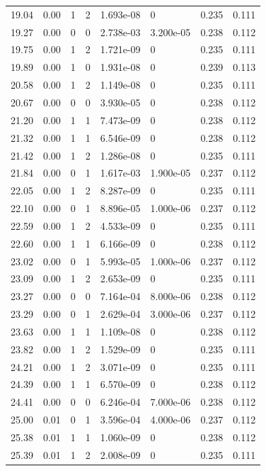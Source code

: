 \documentclass[preview]{standalone}
\begin{document}
{{{\begin{tabular}{L{1.2cm}C{1.2cm} C{0.3cm}C{0.5cm} C{1.4cm}C{1.4cm} C{1.4cm}C{1.4cm}}
  19.04  &  0.00  & 1     &  2 &  1.693e-08  & 0  & 0.235 &  0.111   \\ 
  19.27  &  0.00  & 0     &  0 &  2.738e-03  & 3.200e-05  & 0.238 &  0.112   \\ 
  19.75  &  0.00  & 1     &  2 &  1.721e-09  & 0  & 0.235 &  0.111   \\ 
  19.89  &  0.00  & 1     &  0 &  1.931e-08  & 0  & 0.239 &  0.113   \\ 
  20.58  &  0.00  & 1     &  2 &  1.149e-08  & 0  & 0.235 &  0.111   \\ 
  20.67  &  0.00  & 0     &  0 &  3.930e-05  & 0  & 0.238 &  0.112   \\ 
  21.20  &  0.00  & 1     &  1 &  7.473e-09  & 0  & 0.238 &  0.112   \\ 
  21.32  &  0.00  & 1     &  1 &  6.546e-09  & 0  & 0.238 &  0.112   \\ 
  21.42  &  0.00  & 1     &  2 &  1.286e-08  & 0  & 0.235 &  0.111   \\ 
  21.84  &  0.00  & 0     &  1 &  1.617e-03  & 1.900e-05  & 0.237 &  0.112   \\ 
  22.05  &  0.00  & 1     &  2 &  8.287e-09  & 0  & 0.235 &  0.111   \\ 
  22.10  &  0.00  & 0     &  1 &  8.896e-05  & 1.000e-06  & 0.237 &  0.112   \\ 
  22.59  &  0.00  & 1     &  2 &  4.533e-09  & 0  & 0.235 &  0.111   \\ 
  22.60  &  0.00  & 1     &  1 &  6.166e-09  & 0  & 0.238 &  0.112   \\ 
  23.02  &  0.00  & 0     &  1 &  5.993e-05  & 1.000e-06  & 0.237 &  0.112   \\ 
  23.09  &  0.00  & 1     &  2 &  2.653e-09  & 0  & 0.235 &  0.111   \\ 
  23.27  &  0.00  & 0     &  0 &  7.164e-04  & 8.000e-06  & 0.238 &  0.112   \\ 
  23.29  &  0.00  & 0     &  1 &  2.629e-04  & 3.000e-06  & 0.237 &  0.112   \\ 
  23.63  &  0.00  & 1     &  1 &  1.109e-08  & 0  & 0.238 &  0.112   \\ 
  23.82  &  0.00  & 1     &  2 &  1.529e-09  & 0  & 0.235 &  0.111   \\ 
  24.21  &  0.00  & 1     &  2 &  3.071e-09  & 0  & 0.235 &  0.111   \\ 
  24.39  &  0.00  & 1     &  1 &  6.570e-09  & 0  & 0.238 &  0.112   \\ 
  24.41  &  0.00  & 0     &  0 &  6.246e-04  & 7.000e-06  & 0.238 &  0.112   \\ 
  25.00  &  0.01  & 0     &  1 &  3.596e-04  & 4.000e-06  & 0.237 &  0.112   \\ 
  25.38  &  0.01  & 1     &  1 &  1.060e-09  & 0  & 0.238 &  0.112   \\ 
  25.39  &  0.01  & 1     &  2 &  2.008e-09  & 0  & 0.235 &  0.111   \\ 
\hline 
\end{tabular} 

}}}
\end{document}
